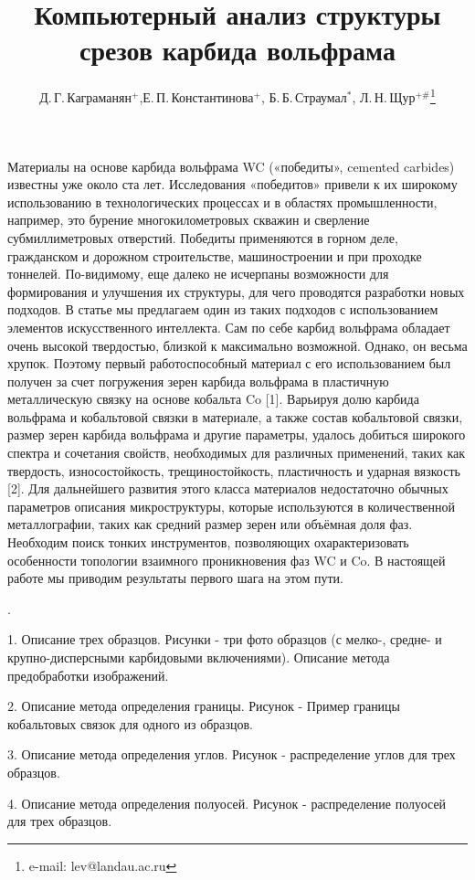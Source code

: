 \documentclass{jetpl}
\title{Компьютерный анализ структуры срезов карбида вольфрама}
\author{Д.\,Г.\,Каграманян$^{+}$,Е.\,П.\,Константинова$^{+}$,
Б.\,Б.\,Страумал$^{*}$, Л.\,Н.\,Щур$^{+\#}$\/\thanks{e-mail: lev@landau.ac.ru}}
\begin{document}
\maketitle

Материалы на основе карбида вольфрама WC («победиты», cemented carbides) известны уже около ста лет. Исследования «победитов» привели к их широкому использованию в технологических процессах и в областях промышленности, например, это бурение многокилометровых скважин и сверление субмиллиметровых отверстий. Победиты применяются в горном деле, гражданском и дорожном строительстве, машиностроении и при проходке тоннелей. По-видимому, еще далеко не исчерпаны возможности для формирования и улучшения их структуры, для чего проводятся разработки новых подходов. В статье мы предлагаем один из таких подходов с использованием элементов искусственного интеллекта.
	Сам по себе карбид вольфрама обладает очень высокой твердостью, близкой к максимально возможной. Однако, он весьма хрупок. Поэтому первый работоспособный материал с его использованием был получен за счет погружения зерен карбида вольфрама в пластичную металлическую связку на основе кобальта Co [1]. Варьируя долю карбида вольфрама и кобальтовой связки в материале, а также состав кобальтовой связки, размер зерен карбида вольфрама и другие параметры, удалось добиться широкого спектра и сочетания свойств, необходимых для различных применений, таких как твердость, износостойкость, трещиностойкость, пластичность и ударная вязкость [2]. Для дальнейшего развития этого класса материалов недостаточно обычных параметров описания микроструктуры, которые используются в количественной металлографии, таких как средний размер зерен или объёмная доля фаз. Необходим поиск тонких инструментов, позволяющих охарактеризовать особенности топологии взаимного проникновения фаз WC и Co. В настоящей работе мы приводим результаты первого шага на этом пути.

.

1. Описание трех образцов. Рисунки - три фото образцов (с мелко-, средне- и крупно-дисперсными карбидовыми включениями).
Описание метода предобработки изображений.

2. Описание метода определения границы.  Рисунок - Пример границы кобальтовых связок для одного из образцов.

3. Описание метода определения углов.  Рисунок - распределение углов для трех образцов.

4. Описание метода определения полуосей. Рисунок - распределение полуосей для трех образцов.
\end{document}
